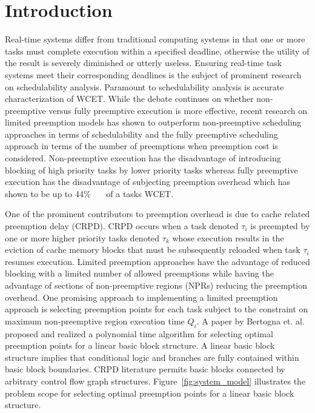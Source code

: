 \section{Introduction}\label{sec:introduction}

Real-time systems differ from traditional computing systems in that one or more tasks must complete execution within a specified deadline, otherwise the utility of the result is severely diminished or utterly useless.  Ensuring real-time task systems meet their corresponding deadlines is the subject of prominent research on schedulability analysis.  Paramount to schedulability analysis is accurate characterization of WCET.  While the debate continues on whether non-preemptive versus fully preemptive execution is more effective, recent research on limited preemption models has shown to outperform non-preemptive scheduling approaches in terms of schedulability and the fully preemptive scheduling approach in terms of the number of preemptions when preemption cost is considered.  Non-preemptive execution has the disadvantage of introducing blocking of high priority tasks by lower priority tasks whereas fully preemptive execution has the disadvantage of subjecting preemption overhead which has shown to be up to 44\%~\cite{pellizzoni:07}~\cite{pellizzoni:08}~\cite{pellizzoni:11} of a tasks WCET.

One of the prominent contributors to preemption overhead is due to cache related preemption delay (CRPD).  CRPD occurs when a task denoted \begin{math}\tau_{i}\end{math} is preempted by one or more higher priority tasks denoted \begin{math}\tau_{k}\end{math} whose execution results in the eviction of cache memory blocks that must be subsequently reloaded when task \begin{math}\tau_{i}\end{math} resumes execution.  Limited preemption approaches have the advantage of reduced blocking with a limited number of allowed preemptions while having the advantage of sections of non-preemptive regions (NPRs) reducing the preemption overhead.  One promising approach to implementing a limited preemption approach is selecting preemption points for each task subject to the constraint on maximum non-preemptive region execution time \begin{math}Q_{i}\end{math}.  A paper by Bertogna et. al.~\cite{bertogna:11} proposed and realized a polynomial time algorithm for selecting optimal preemption points for a linear basic block structure.  A linear basic block structure implies that conditional logic and branches are fully contained within basic block boundaries. CRPD literature permits basic blocks connected by arbitrary control flow graph structures.  Figure~\ref{fig:system_model} illustrates the problem scope for selecting optimal preemption points for a linear basic block structure.


